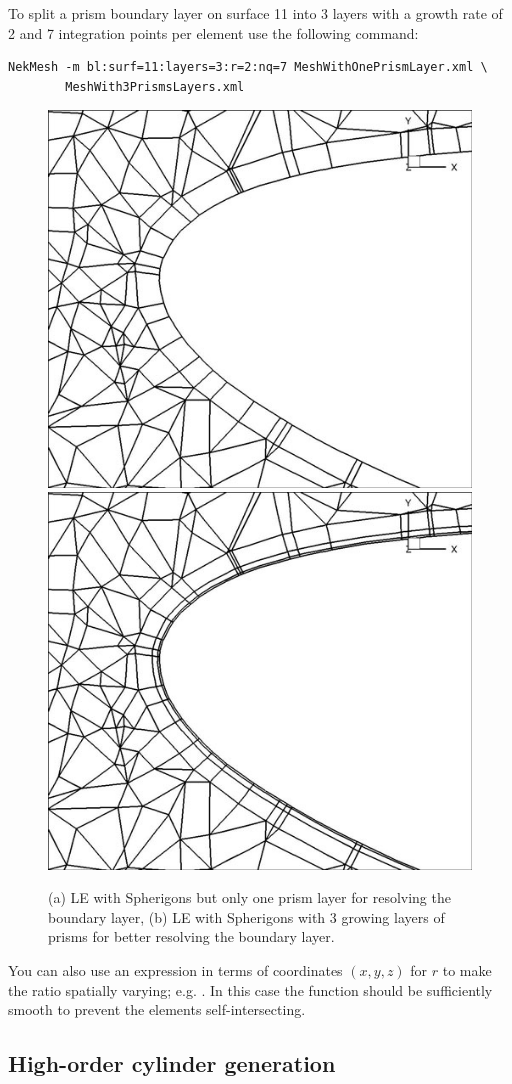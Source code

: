 To split a prism boundary layer on surface 11 into 3 layers with a growth rate
of 2 and 7 integration points per element use the following command:
\begin{lstlisting}[style=BashInputStyle]
  NekMesh -m bl:surf=11:layers=3:r=2:nq=7 MeshWithOnePrismLayer.xml \
        MeshWith3PrismsLayers.xml
\end{lstlisting}
%
\begin{figure}[!htbp]
  \begin{center}
    \includegraphics[width = 0.47 \textwidth]{img/SphnoBL.jpg}
    \includegraphics[width = 0.47 \textwidth]{img/SphBL.jpg}
    \caption{(a) LE with Spherigons but only one prism layer for resolving the
      boundary layer, (b) LE with Spherigons with 3 growing layers of prisms for
      better resolving the boundary layer.}
  \end{center}
\end{figure}

\begin{notebox}
  You can also use an expression in terms of coordinates $(x,y,z)$ for $r$ to
  make the ratio spatially varying; e.g. \inltt{r=sin(x)}. In this case the
  function should be sufficiently smooth to prevent the elements
  self-intersecting.
\end{notebox}

\subsection{High-order cylinder generation}

